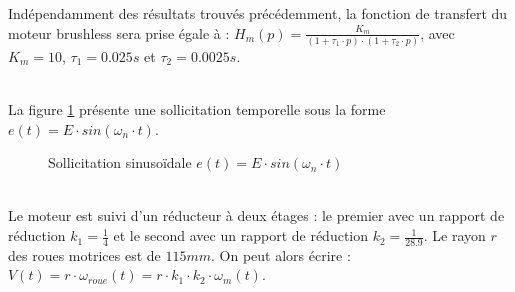 \begin{center}
\end{center}

Indépendamment des résultats trouvés précédemment, la fonction de transfert du moteur brushless sera prise égale à : $H_m(p)=\frac{K_m}{(1+\tau_1\cdot p)\cdot (1+\tau_2\cdot p)}$, avec $K_m=10$, $\tau_1=0.025s$ et $\tau_2=0.0025s$.


~\ \\

La figure \ref{fig09} présente une sollicitation temporelle sous la forme $e(t)=E\cdot sin(\omega_n\cdot t)$.

\vspace{-0.5cm}

\begin{figure}[ht!]
\begin{center}
  \resizebox{0.8\textwidth}{!}{}
\end{center}
\caption{Sollicitation sinusoïdale $e(t)=E\cdot sin(\omega_n\cdot t)$}
\label{fig09}
\end{figure}



~\ \\

Le moteur est suivi d'un réducteur à deux étages : le premier avec un rapport de réduction $k_1 = \frac{1}{4}$ et le second avec un rapport de réduction $k_2 = \frac{1}{28.9}$. Le rayon $r$ des roues motrices est de $115mm$. On peut alors écrire : $V(t)=r\cdot \omega_{roue}(t)=r\cdot k_1\cdot k_2\cdot \omega_m(t)$.

